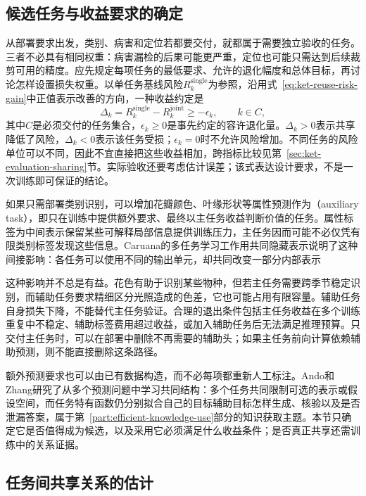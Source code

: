 \subsection{候选任务与收益要求的确定}
\label{sec:ket-sharing-candidates}

从部署要求出发，类别、病害和定位若都要交付，就都属于需要独立验收的任务。三者不必具有相同权重：病害漏检的后果可能更严重，定位也可能只需达到后续裁剪可用的精度。应先规定每项任务的最低要求、允许的退化幅度和总体目标，再讨论怎样设置损失权重。以单任务基线风险$R_k^{\mathrm{single}}$为参照，沿用式~\eqref{eq:ket-reuse-risk-gain}中正值表示改善的方向，一种收益约定是
\begin{equation}
  \Delta_k=R_k^{\mathrm{single}}-R_k^{\mathrm{joint}}
  \geq-\epsilon_k,
  \qquad k\in C,
  \label{eq:ket-sharing-benefit-constraint}
\end{equation}
其中$C$是必须交付的任务集合，$\epsilon_k\geq0$是事先约定的容许退化量。$\Delta_k>0$表示共享降低了风险，$\Delta_k<0$表示该任务受损；$\epsilon_k=0$时不允许风险增加。不同任务的风险单位可以不同，因此不宜直接把这些收益相加，跨指标比较见第~\ref{sec:ket-evaluation-sharing}节。实际验收还要考虑估计误差；该式表达设计要求，不是一次训练即可保证的结论。

如果只需部署类别识别，可以增加花瓣颜色、叶缘形状等属性预测作为（auxiliary task），即只在训练中提供额外要求、最终以主任务收益判断价值的任务。属性标签为中间表示保留某些可解释局部信息提供训练压力，主任务因而可能不必仅凭有限类别标签发现这些信息。Caruana的多任务学习工作用共同隐藏表示说明了这种间接影响：各任务可以使用不同的输出单元，却共同改变一部分内部表示

这种影响并不总是有益。花色有助于识别某些物种，但若主任务需要跨季节稳定识别，而辅助任务要求精细区分光照造成的色差，它也可能占用有限容量。辅助任务自身损失下降，不能替代主任务验证。合理的退出条件包括主任务收益在多个训练重复中不稳定、辅助标签费用超过收益，或加入辅助任务后无法满足推理预算。只交付主任务时，可以在部署中删除不再需要的辅助头；如果主任务前向计算依赖辅助预测，则不能直接删除这条路径。

额外预测要求也可以由已有数据构造，而不必每项都重新人工标注。Ando和Zhang研究了从多个预测问题中学习共同结构：多个任务共同限制可选的表示或假设空间，而任务特有函数仍分别拟合自己的目标辅助目标怎样生成、核验以及是否泄漏答案，属于第~\ref{part:efficient-knowledge-use}部分的知识获取主题。本节只确定它是否值得成为候选，以及采用它必须满足什么收益条件；是否真正共享还需训练中的关系证据。

\subsection{任务间共享关系的估计}
\label{sec:ket-sharing-affinity}

